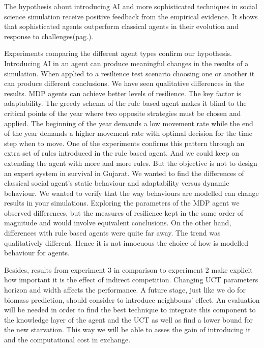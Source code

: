 \documentclass[11pt,oneside,a4paper,openright]{report}
\begin{document}
The hypothesis about introducing AI and more sophisticated techniques in social science simulation receive
positive feedback from the empirical evidence. It shows that sophisticated agents outperform classical agents in their evolution and response to challenges(pag.\pageref{sec:Experiments}). 

Experiments comparing the different agent types confirm our hypothesis. Introducing AI in an agent can produce
meaningful changes in the results of a simulation. When applied to a resilience test scenario choosing
one or another it can produce different conclusions. We have seen qualitative differences in the results. MDP agents can achieve better levels of resilience. The key factor is adaptability. The greedy schema of the 
rule based agent makes it blind to the critical points of the year where two opposite strategies must be
chosen and applied. The beginning of the year demands a low movement rate while the end of the year demands
a higher movement rate with optimal decision for the time step when to move. One of the experiments confirms this pattern through an extra set of rules introduced in the rule based agent. And we could keep on extending the agent with more and more rules. But the objective is not to design an expert system in survival in Gujarat. We wanted to find the differences of classical social agent's static behaviour and adaptability versus dynamic behaviour. We wanted to verify that the way behaviours are modelled can change results in your simulations. Exploring the parameters of the MDP agent we observed differences, but the measures of resilience kept in the same order of magnitude and would involve equivalent conclusions. On the other hand, differences with rule based agents were quite far away. The trend was qualitatively different. Hence it is not innocuous the choice of how is modelled behaviour for agents.

Besides, results from experiment 3 in comparison to experiment 2 make explicit how important it is the effect of indirect competition. Changing UCT parameters horizon and width affects the performance. A future stage, just like we do for biomass prediction, should consider to introduce
neighbours' effect. An evaluation will be needed in order to find the best technique to integrate this component to the knowledge layer of the agent and the UCT as well as find a lower bound for the new starvation. This way we will be able to asses the gain of introducing it and the computational cost in exchange.
\end{document}
